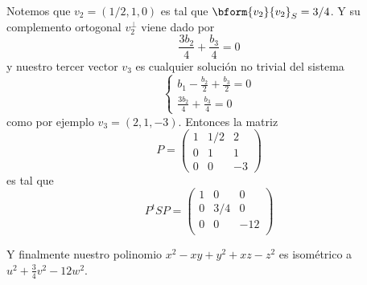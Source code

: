 	Notemos que $v_2=(1/2,1,0)$ es tal que $\bform{v_2}{v_2}_S = 3/4$. Y su complemento ortogonal $v_2^\perp$ viene dado por
	\[ \frac{3b_2}{4}+ \frac{b_3}{4} = 0\]
	y nuestro tercer vector $v_3$ es cualquier solución no trivial del sistema
	\[ \begin{cases}\displaystyle
	b_1-\frac{b_2}{2}+\frac{b_3}{2} = 0 \\[.5em] \displaystyle
	\frac{3b_2}{4}+ \frac{b_3}{4} = 0
	\end{cases} \]
	como por ejemplo $v_3 = (2,1,-3)$. Entonces la matriz 
	\[ P = \begin{pmatrix}
	1 & 1/2 & 2\\
	0 & 1 & 1\\
	0 & 0 & -3
	\end{pmatrix} \]
	es tal que
	\[ P^tSP = \begin{pmatrix}
	1 & 0 & 0 \\
	0 & 3/4 & 0 \\
	0 & 0 & -12 \\
	\end{pmatrix} \]
	
	Y finalmente nuestro polinomio $x^2-xy+y^2+xz-z^2$ es isométrico a $u^2+\frac{3}{4}v^2 -12 w^2$.
	
